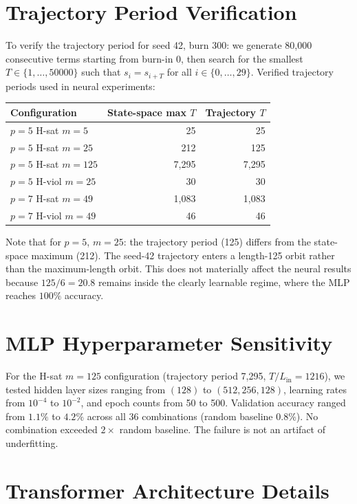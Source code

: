 \documentclass[11pt]{article}
\theoremstyle{plain}
\theoremstyle{definition}
\begin{document}
\section{Trajectory Period Verification}
\label{app:traj}

To verify the trajectory period for seed 42, burn 300: we generate 80{,}000 consecutive terms starting from burn-in 0, then search for the smallest $T \in \{1,\ldots,50000\}$ such that $s_i = s_{i+T}$ for all $i \in \{0,\ldots,29\}$. Verified trajectory periods used in neural experiments:

\begin{center}
\begin{tabular}{@{}lrr@{}}
\toprule
Configuration & State-space max $T$ & Trajectory $T$\\
\midrule
$p=5$ H-sat $m=5$   & 25      & 25\\
$p=5$ H-sat $m=25$  & 212     & 125\\
$p=5$ H-sat $m=125$ & 7{,}295  & 7{,}295\\
$p=5$ H-viol $m=25$ & 30      & 30\\
$p=7$ H-sat $m=49$  & 1{,}083  & 1{,}083\\
$p=7$ H-viol $m=49$ & 46      & 46\\
\bottomrule
\end{tabular}
\end{center}

Note that for $p=5$, $m=25$: the trajectory period (125) differs from the state-space maximum (212). The seed-42 trajectory enters a length-125 orbit rather than the maximum-length orbit. This does not materially affect the neural results because $125/6 = 20.8$ remains inside the clearly learnable regime, where the MLP reaches $100\%$ accuracy.

\section{MLP Hyperparameter Sensitivity}
\label{app:mlp}

For the H-sat $m=125$ configuration (trajectory period 7{,}295, $T/L_{\mathrm{in}} = 1216$), we tested hidden layer sizes ranging from $(128)$ to $(512, 256, 128)$, learning rates from $10^{-4}$ to $10^{-2}$, and epoch counts from 50 to 500. Validation accuracy ranged from $1.1\%$ to $4.2\%$ across all 36 combinations (random baseline $0.8\%$). No combination exceeded $2\times$ random baseline. The failure is not an artifact of underfitting.

\section{Transformer Architecture Details}
\label{app:transformer}
\end{document}
